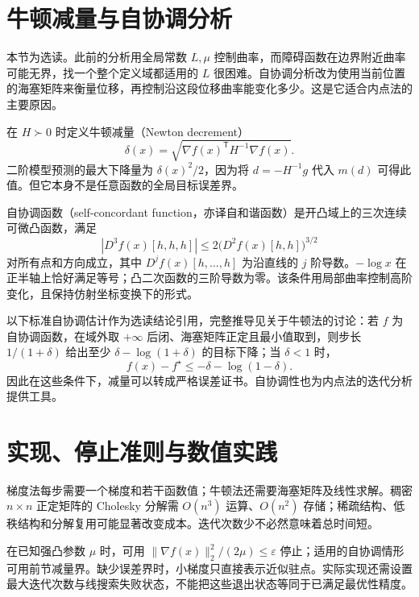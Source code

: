 \documentclass[UTF8,12pt,a4paper,fontset=fandol]{ctexbook}
\begin{document}
\section{牛顿减量与自协调分析}

本节为选读。此前的分析用全局常数 $L,\mu$ 控制曲率，而障碍函数在边界附近曲率可能无界，找一个整个定义域都适用的 $L$ 很困难。自协调分析改为使用当前位置的海塞矩阵来衡量位移，再控制沿这段位移曲率能变化多少。这是它适合内点法的主要原因。

在 $H\succ0$ 时定义牛顿减量（Newton decrement）
\[
 \delta(x)=\sqrt{\nabla f(x)^{\mathsf T}H^{-1}\nabla f(x)}.
\]
二阶模型预测的最大下降量为 $\delta(x)^2/2$，因为将 $d=-H^{-1}g$ 代入 $m(d)$ 可得此值。但它本身不是任意函数的全局目标误差界。

自协调函数（self-concordant function，亦译自和谐函数）是开凸域上的三次连续可微凸函数，满足
\[
 |D^3f(x)[h,h,h]|\leq2\bigl(D^2f(x)[h,h]\bigr)^{3/2}
\]
对所有点和方向成立，其中 $D^j f(x)[h,\ldots,h]$ 为沿直线的 $j$ 阶导数。$-\log x$ 在正半轴上恰好满足等号；凸二次函数的三阶导数为零。该条件用局部曲率控制高阶变化，且保持仿射坐标变换下的形式。

以下标准自协调估计作为选读结论引用，完整推导见\cite{boyd-vandenberghe}关于牛顿法的讨论：若 $f$ 为自协调函数，在域外取 $+\infty$ 后闭、海塞矩阵正定且最小值取到，则步长 $1/(1+\delta)$ 给出至少 $\delta-\log(1+\delta)$ 的目标下降；当 $\delta<1$ 时，
\[
 f(x)-f^\star\leq-\delta-\log(1-\delta).
\]
因此在这些条件下，减量可以转成严格误差证书。自协调性也为内点法的迭代分析提供工具。

\section{实现、停止准则与数值实践}

梯度法每步需要一个梯度和若干函数值；牛顿法还需要海塞矩阵及线性求解。稠密 $n\times n$ 正定矩阵的 Cholesky 分解需 $O(n^3)$ 运算、$O(n^2)$ 存储；稀疏结构、低秩结构和分解复用可能显著改变成本。迭代次数少不必然意味着总时间短。

在已知强凸参数 $\mu$ 时，可用 $\|\nabla f(x)\|_2^2/(2\mu)\leq\varepsilon$ 停止；适用的自协调情形可用前节减量界。缺少误差界时，小梯度只直接表示近似驻点。实际实现还需设置最大迭代次数与线搜索失败状态，不能把这些退出状态等同于已满足最优性精度。
\end{document}
